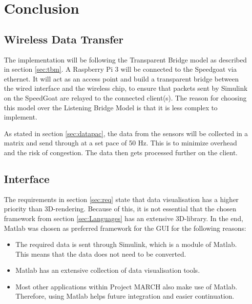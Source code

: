 \section{Conclusion}\label{sec:rescon}
\subsection{Wireless Data Transfer}
The implementation will be following the Transparent Bridge model as described in section \ref{sec:tbm}. A Raspberry Pi 3 will be connected to the Speedgoat via ethernet. It will act as an access point and build a transparent bridge between the wired interface and the wireless chip, to ensure that packets sent by Simulink on the SpeedGoat are relayed to the connected client(s). The reason for choosing this model over the Listening Bridge Model is that it is less complex to implement. 

As stated in section \ref{sec:datapac}, the data from the sensors will be collected in a matrix and send through at a set pace of 50 Hz. This is to minimize overhead and the risk of congestion. The data then gets processed further on the client.
\subsection{Interface}
The requirements in section \ref{sec:req} state that data visualisation has a higher priority than 3D-rendering. Because of this, it is not essential that the chosen framework from section \ref{sec:Languages} has an extensive 3D-library. In the end, Matlab was chosen as preferred framework for the GUI for the following reasons:
\begin{itemize}
	\item The required data is sent through Simulink, which is a module of Matlab. This means that the data does not need to be converted.
	\item Matlab has an extensive collection of data visualisation tools.
	\item Most other applications within Project MARCH also make use of Matlab. Therefore, using Matlab helps future integration and easier continuation.
\end{itemize}